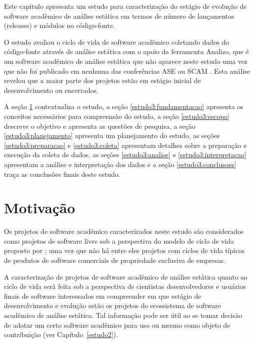 \label{estudo3}

Este capítulo apresenta um estudo para caracterização do estágio de evolução de
software acadêmico de análise estática em termos de número de lançamentos
(releases) e módulos no código-fonte.

O estudo avaliou o ciclo de vida de software acadêmico coletando
dados do código-fonte através de análise estática com o apoio da
ferramenta Analizo, que é um software acadêmico de análise estática que não
aparece neste estudo uma vez que não foi publicado em nenhuma das
conferências ASE ou SCAM \cite{terceiro2010analizo}.
Esta análise revelou que a maior parte dos projetos
estão em estágio inicial de desenvolvimento ou encerrados.

A seção \ref{estudo3:introducao} contextualiza o estudo,
a seção \ref{estudo3:fundamentacao} apresenta os conceitos necessários para compreensão do estudo,
a seção \ref{estudo3:escopo} descreve o objetivo e apresenta as questões de pesquisa,
a seção \ref{estudo3:planejamento} apresenta um planejamento do estudo,
as seções \ref{estudo3:preparacao} e \ref{estudo3:coleta} apresentam detalhes sobre a preparação e execução da coleta de dados,
as seções \ref{estudo3:analise} e \ref{estudo3:interpretacao} apresentam a análise e interpretação dos dados e
a seção \ref{estudo3:conclusoes} traça as conclusões finais deste estudo.

\section{Motivação} \label{estudo3:introducao} %

Os projetos de software acadêmico caracterizados neste estudo são considerados
como projetos de software livre sob a perspectiva do modelo de ciclo de vida proposto por
; uma vez que não há entre eles projetos com
ciclos de vida típicos de produtos de software comerciais de propriedade exclusiva de empresas.

A caracterização de projetos de software acadêmico de análise estática quanto
ao ciclo de vida será feita sob a perspectiva de cientistas desenvolvedores e
usuários finais de software interessados em compreender em que estágio de
desenvolvimento e evolução estão os projetos do ecossistema de software
acadêmico de análise estática. Tal informação pode ser 
útil ao se tomar decisão de adotar um certo software acadêmico para uso ou mesmo como
objeto de contribuição (ver Capítulo~\ref{estudo2}).

